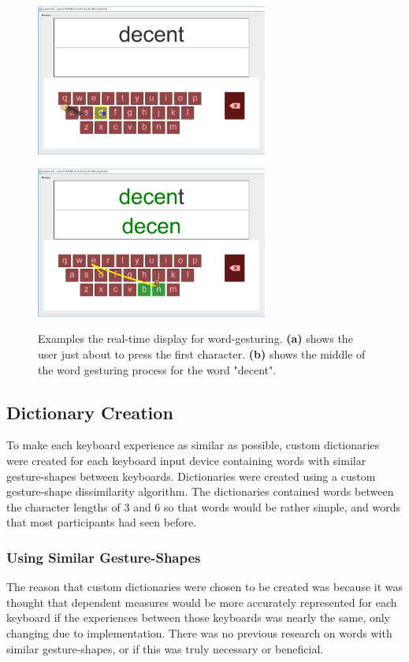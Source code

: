 \begin{figure}[h]
	\centering
	\begin{minipage}[t]{2.9in}
		\includegraphics[width=3in]{fig_update1_keyboard}
		\label{update_a}
	\end{minipage}
	\begin{minipage}[t]{2.9in}
		\includegraphics[width=3in]{fig_update2_keyboard}
		\label{update_b}
	\end{minipage}
	\caption[Display: Text Area]{Examples the real-time display for word-gesturing. \textbf{(a)} shows the user just about to press the first character. \textbf{(b)} shows the middle of the word gesturing process for the word "decent".}
	\label{display_area}
\end{figure}

\subsection{Dictionary Creation}
To make each keyboard experience as similar as possible, custom dictionaries were created for each keyboard input device containing words with similar gesture-shapes between keyboards. Dictionaries were created using a custom gesture-shape dissimilarity algorithm. The dictionaries contained words between the character lengths of 3 and 6 so that words would be rather simple, and words that most participants had seen before.

\subsubsection{Using Similar Gesture-Shapes}
The reason that custom dictionaries were chosen to be created was because it was thought that dependent measures would be more accurately represented for each keyboard if the experiences between those keyboards was nearly the same, only changing due to implementation. There was no previous research on words with similar gesture-shapes, or if this was truly necessary or beneficial.

